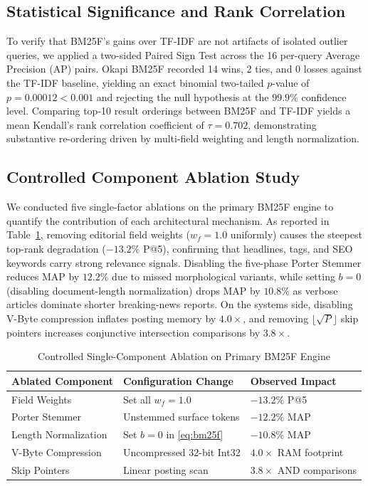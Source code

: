 \subsection{Statistical Significance and Rank Correlation}
To verify that BM25F's gains over TF-IDF are not artifacts of isolated outlier queries, we applied a two-sided Paired Sign Test across the 16 per-query Average Precision (AP) pairs. Okapi BM25F recorded 14 wins, 2 ties, and 0 losses against the TF-IDF baseline, yielding an exact binomial two-tailed $p$-value of $p = 0.00012 < 0.001$ and rejecting the null hypothesis at the $99.9\%$ confidence level. Comparing top-10 result orderings between BM25F and TF-IDF yields a mean Kendall's rank correlation coefficient of $\tau = 0.702$, demonstrating substantive re-ordering driven by multi-field weighting and length normalization.

\subsection{Controlled Component Ablation Study}
We conducted five single-factor ablations on the primary BM25F engine to quantify the contribution of each architectural mechanism. As reported in Table~\ref{tab:ablation}, removing editorial field weights ($w_f = 1.0$ uniformly) causes the steepest top-rank degradation ($-13.2\%$ P@5), confirming that headlines, tags, and SEO keywords carry strong relevance signals. Disabling the five-phase Porter Stemmer reduces MAP by $12.2\%$ due to missed morphological variants, while setting $b = 0$ (disabling document-length normalization) drops MAP by $10.8\%$ as verbose articles dominate shorter breaking-news reports. On the systems side, disabling V-Byte compression inflates posting memory by $4.0\times$, and removing $\lfloor\sqrt{P}\rfloor$ skip pointers increases conjunctive intersection comparisons by $3.8\times$.

\begin{table}[htbp]
\caption{Controlled Single-Component Ablation on Primary BM25F Engine}
\begin{center}
\setlength{\tabcolsep}{5pt}
\renewcommand{\arraystretch}{1.15}
\begin{tabular}{@{}lll@{}}
\toprule
\textbf{Ablated Component} & \textbf{Configuration Change} & \textbf{Observed Impact} \\
\midrule
Field Weights & Set all $w_f = 1.0$ & $-13.2\%$ P@5 \\
Porter Stemmer & Unstemmed surface tokens & $-12.2\%$ MAP \\
Length Normalization & Set $b = 0$ in \eqref{eq:bm25f} & $-10.8\%$ MAP \\
V-Byte Compression & Uncompressed 32-bit Int32 & $4.0\times$ RAM footprint \\
Skip Pointers & Linear posting scan & $3.8\times$ AND comparisons \\
\bottomrule
\end{tabular}
\label{tab:ablation}
\end{center}
\end{table}

